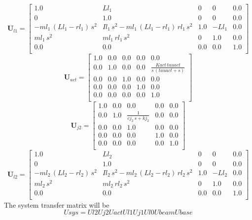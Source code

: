 \documentclass[12pt]{article}
\newcommand{\M}[1]{\mathbf{#1}}
\begin{document}
\begin{equation}
\M{U}_{l1}= \left[ \begin{array}{ccccc}1.0&Ll_1&0&0&0.0\\ 0&1.0&0&0&0.0\\ -ml_1\,\left(Ll_1- rl_1\right)\,s^2&Il_1\,s^2-ml_1\,\left(Ll_1-rl_1\right)\,rl_1\,s^2& 1.0&-Ll_1&0.0\\ ml_1\,s^2&ml_1\,rl_1\,s^2&0&1.0&0.0\\ 0.0&0.0&0.0& 0.0&1.0\\ \end{array} \right] 
\end{equation}
\begin{equation}
\M{U}_{act}= \left[ \begin{array}{ccccc}1.0&0.0&0.0&0.0&0.0\\ 0.0&1.0&0.0&0.0& \displaystyle \frac{Kact\,tauact }{s\,\left(tauact+s\right)}\\ 0.0&0.0&1.0&0.0&0.0\\ 0.0&0.0& 0.0&1.0&0.0\\ 0.0&0.0&0.0&0.0&1.0\\ \end{array} \right] 
\end{equation}
\begin{equation}
\M{U}_{j2}= \left[ \begin{array}{ccccc}1.0&0.0&0.0&0.0&0.0\\ 0.0&1.0& \displaystyle \frac{1}{cj_2\,s+kj_2}& 0.0&0.0\\ 0.0&0.0&1.0&0.0&0.0\\ 0.0&0.0&0.0&1.0&0.0\\ 0.0&0.0&0.0 &0.0&1.0\\ \end{array} \right] 
\end{equation}
\begin{equation}
\M{U}_{l2}= \left[ \begin{array}{ccccc}1.0&Ll_2&0&0&0.0\\ 0&1.0&0&0&0.0\\ -ml_2\,\left(Ll_2- rl_2\right)\,s^2&Il_2\,s^2-ml_2\,\left(Ll_2-rl_2\right)\,rl_2\,s^2& 1.0&-Ll_2&0.0\\ ml_2\,s^2&ml_2\,rl_2\,s^2&0&1.0&0.0\\ 0.0&0.0&0.0& 0.0&1.0\\ \end{array} \right] 
\end{equation}
The system transfer matrix will be
\begin{equation}
	Usys=Ul2 Uj2 Uact Ul1 Uj1 Ul0 Ubeam Ubase
\end{equation}
\end{document}
